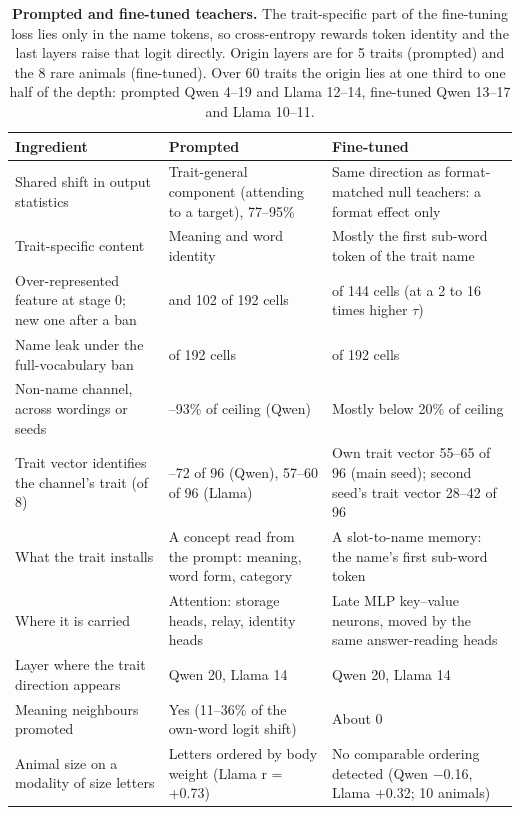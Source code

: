 \begin{table}[p]
\caption{\textbf{Prompted and fine-tuned teachers.} The trait-specific part of the fine-tuning loss lies only in the name tokens, so cross-entropy rewards token identity and the last layers raise that logit directly. Origin layers are for 5 traits (prompted) and the 8 rare animals (fine-tuned). Over 60 traits the origin lies at one third to one half of the depth: prompted Qwen 4--19 and Llama 12--14, fine-tuned Qwen 13--17 and Llama 10--11.}
\label{edtab:5}
{\tabsize\setlength{\tabcolsep}{4pt}
\begin{tabular}{@{}>{\raggedright\arraybackslash}p{0.307\dimexpr\textwidth-4\tabcolsep\relax}>{\raggedright\arraybackslash}p{0.325\dimexpr\textwidth-4\tabcolsep\relax}>{\raggedright\arraybackslash}p{0.368\dimexpr\textwidth-4\tabcolsep\relax}@{}}
\toprule
\textbf{Ingredient} & \textbf{Prompted} & \textbf{Fine-tuned}\\
\midrule
Shared shift in output statistics & Trait-general component (attending to a target), 77--95\% & Same direction as format-matched null teachers: a format effect only\\
Trait-specific content & Meaning and word identity & Mostly the first sub-word token of the trait name\\
Over-represented feature at stage 0; new one after a ban & 131 and 102 of 192 cells & 0 of 144 cells (at a 2 to 16 times higher $\tau$)\\
Name leak under the full-vocabulary ban & 104 of 192 cells & 136 of 192 cells\\
Non-name channel, across wordings or seeds & 44--93\% of ceiling (Qwen) & Mostly below 20\% of ceiling\\
Trait vector identifies the channel's trait (of 8) & 43--72 of 96 (Qwen), 57--60 of 96 (Llama) & Own trait vector 55--65 of 96 (main seed); second seed's trait vector 28--42 of 96\\
What the trait installs & A concept read from the prompt: meaning, word form, category & A slot-to-name memory: the name's first sub-word token\\
Where it is carried & Attention: storage heads, relay, identity heads & Late MLP key--value neurons, moved by the same answer-reading heads\\
Layer where the trait direction appears & Qwen 20, Llama 14 & Qwen 20, Llama 14\\
Meaning neighbours promoted & Yes (11--36\% of the own-word logit shift) & About 0\\
Animal size on a modality of size letters & Letters ordered by body weight (Llama r = +0.73) & No comparable ordering detected (Qwen $-$0.16, Llama +0.32; 10 animals)\\

\end{tabular}}
\end{table}
